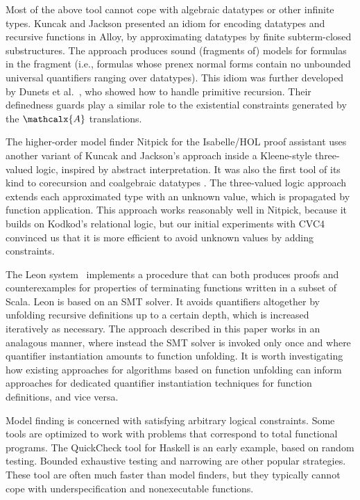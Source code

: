 \documentclass[runningheads,a4paper]{llncs}
\newcommand\cvc{CVC4\xspace}
\newcommand{\conv}{\mathcalx{A}}
\begin{document}
Most of the above tool cannot cope with algebraic datatypes or other infinite
types. Kuncak and Jackson \cite{kuncak-jackson-2005} presented an idiom for
encoding datatypes and recursive functions in Alloy, by approximating datatypes
by finite subterm-closed substructures. The approach produces sound (fragments
of) models for formulas in the  fragment
(i.e., formulas whose prenex normal forms contain no unbounded universal
quantifiers ranging over datatypes). This idiom was further developed by Dunets
et al.\ \cite{dunets-et-al-2010}, who showed how to handle primitive recursion.
Their definedness guards play a similar role to the existential constraints
generated by the $\conv$ translations.

The higher-order model finder Nitpick for the Isabelle/HOL proof assistant uses
another variant of Kuncak and Jackson's approach inside a Kleene-style
three-valued logic, inspired by abstract interpretation. It was also the first
tool of its kind to corecursion and coalgebraic datatypes
\cite{blanchette-2013-relational}. The three-valued logic approach extends each
approximated type with an unknown value, which is propagated by function
application. This approach works reasonably well in Nitpick, because it builds
on Kodkod's relational logic, but our initial experiments with \cvc convinced
us that it is more efficient to avoid unknown values by adding constraints.

The Leon system~\cite{blanc2013overview} implements a procedure that can both
produces proofs and counterexamples for properties of terminating functions
written in a subset of Scala. Leon is based on an SMT solver. It avoids
quantifiers altogether by unfolding recursive definitions up to a certain
depth, which is increased iteratively as necessary.
The approach described in this paper works in an analagous manner, 
where instead the SMT solver is invoked only once 
and where quantifier instantiation amounts to function unfolding. It is worth
investigating how existing approaches for algorithms based on function
unfolding can inform approaches for dedicated quantifier instantiation
techniques for function definitions, and vice versa.

Model finding is concerned with satisfying arbitrary logical constraints. Some
tools are optimized to work with problems that correspond to total functional
programs. The QuickCheck tool for Haskell \cite{claessen-hughes-2000} is an
early example, based
on random testing. Bounded exhaustive testing \cite{runciman-et-al-2008} and
narrowing \cite{lindblad-2008-testing} are other popular strategies. These tool
are often much faster than model finders, but they typically cannot cope with
underspecification and nonexecutable functions.
\end{document}

